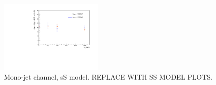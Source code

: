 \begin{figure}
\begin{center}
\includegraphics[width=0.45\textwidth]{figures/monoZ_sigma_limits_variedDMmass.pdf}
\caption{Mono-jet channel, sS model. REPLACE WITH SS MODEL PLOTS.}
\label{fig:Monojet_SSD_limit}
\end{center}
\end{figure}

